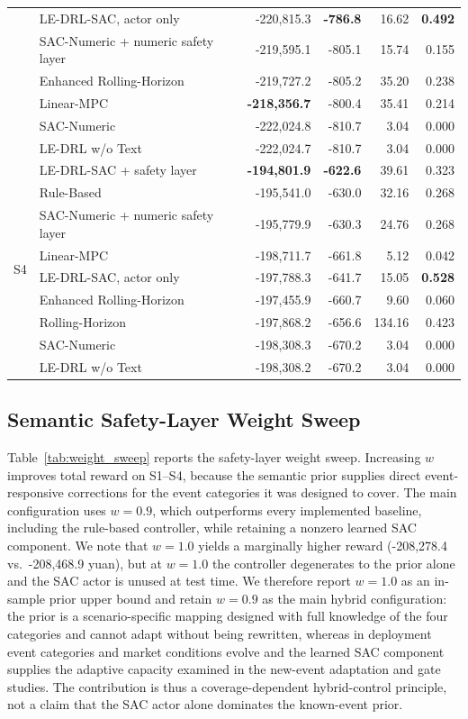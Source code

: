 \documentclass{ieeeaccess}
\begin{document}
\begin{table}[t!]
\begin{tabular}{llrrrr}
& LE-DRL-SAC, actor only & -220,815.3 & \textbf{-786.8} & 16.62 & \textbf{0.492} \\
& SAC-Numeric + numeric safety layer & -219,595.1 & -805.1 & 15.74 & 0.155 \\
& Enhanced Rolling-Horizon & -219,727.2 & -805.2 & 35.20 & 0.238 \\
& Linear-MPC & \textbf{-218,356.7} & -800.4 & 35.41 & 0.214 \\
& SAC-Numeric & -222,024.8 & -810.7 & 3.04 & 0.000 \\
& LE-DRL w/o Text & -222,024.7 & -810.7 & 3.04 & 0.000 \\
\midrule
\multirow{9}{*}{S4} & LE-DRL-SAC + safety layer & \textbf{-194,801.9} & \textbf{-622.6} & 39.61 & 0.323 \\
& Rule-Based & -195,541.0 & -630.0 & 32.16 & 0.268 \\
& SAC-Numeric + numeric safety layer & -195,779.9 & -630.3 & 24.76 & 0.268 \\
& Linear-MPC & -198,711.7 & -661.8 & 5.12 & 0.042 \\
& LE-DRL-SAC, actor only & -197,788.3 & -641.7 & 15.05 & \textbf{0.528} \\
& Enhanced Rolling-Horizon & -197,455.9 & -660.7 & 9.60 & 0.060 \\
& Rolling-Horizon & -197,868.2 & -656.6 & 134.16 & 0.423 \\
& SAC-Numeric & -198,308.3 & -670.2 & 3.04 & 0.000 \\
& LE-DRL w/o Text & -198,308.2 & -670.2 & 3.04 & 0.000 \\
\bottomrule
\end{tabular}
\end{table}

\subsection{Semantic Safety-Layer Weight Sweep}
Table~\ref{tab:weight_sweep} reports the safety-layer weight sweep. Increasing $w$ improves total reward on S1--S4, because the semantic prior supplies direct event-responsive corrections for the event categories it was designed to cover. The main configuration uses $w=0.9$, which outperforms every implemented baseline, including the rule-based controller, while retaining a nonzero learned SAC component. We note that $w=1.0$ yields a marginally higher reward (-208,278.4 vs.\ -208,468.9 yuan), but at $w=1.0$ the controller degenerates to the prior alone and the SAC actor is unused at test time. We therefore report $w=1.0$ as an in-sample prior upper bound and retain $w=0.9$ as the main hybrid configuration: the prior is a scenario-specific mapping designed with full knowledge of the four categories and cannot adapt without being rewritten, whereas in deployment event categories and market conditions evolve and the learned SAC component supplies the adaptive capacity examined in the new-event adaptation and gate studies. The contribution is thus a coverage-dependent hybrid-control principle, not a claim that the SAC actor alone dominates the known-event prior.
\end{document}
